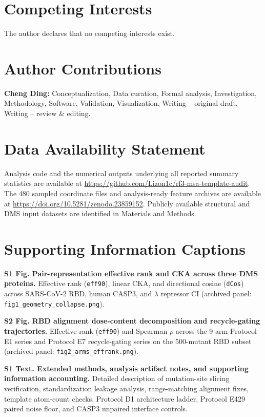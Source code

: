\documentclass[10pt,a4paper]{article}
\begin{document}
\section*{Competing Interests}
The author declares that no competing interests exist.

\section*{Author Contributions}
\textbf{Cheng Ding:} Conceptualization, Data curation, Formal analysis, Investigation, Methodology, Software, Validation, Visualization, Writing -- original draft, Writing -- review \& editing.

\section*{Data Availability Statement}
Analysis code and the numerical outputs underlying all reported summary statistics are available at \url{https://github.com/Lizon1c/rf3-msa-template-audit}. The 480 sampled coordinate files and analysis-ready feature archives are available at \url{https://doi.org/10.5281/zenodo.23859152}. Publicly available structural and DMS input datasets are identified in Materials and Methods.

\section*{Supporting Information Captions}

\textbf{S1 Fig. Pair-representation effective rank and CKA across three DMS proteins.}
Effective rank (\texttt{eff90}), linear CKA, and directional cosine (\texttt{dCos}) across SARS-CoV-2 RBD, human CASP3, and $\lambda$ repressor CI (archived panel: \texttt{fig1\_geometry\_collapse.png}).

\textbf{S2 Fig. RBD alignment dose-content decomposition and recycle-gating trajectories.}
Effective rank (\texttt{eff90}) and Spearman $\rho$ across the 9-arm Protocol E1 series and Protocol E7 recycle-gating series on the 500-mutant RBD subset (archived panel: \texttt{fig2\_arms\_effrank.png}).

\textbf{S1 Text. Extended methods, analysis artifact notes, and supporting information accounting.}
Detailed description of mutation-site slicing verification, standardization leakage analysis, range-matching alignment fixes, template atom-count checks, Protocol D1 architecture ladder, Protocol E429 paired noise floor, and CASP3 unpaired interface controls.
\end{document}
